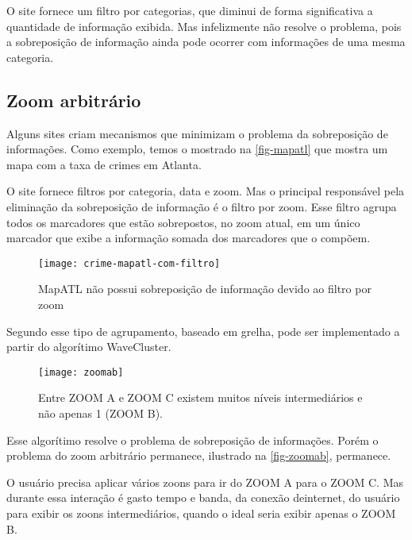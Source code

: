 O site fornece um filtro por categorias, que diminui de forma significativa a quantidade de informação exibida.  Mas infelizmente não resolve o problema, pois a sobreposição de informação ainda pode ocorrer com informações de uma mesma categoria.



\subsection{Zoom arbitrário}
Alguns sites criam mecanismos que minimizam o problema da sobreposição de informações. Como exemplo, temos o   mostrado na \autoref{fig-mapatl} que mostra um mapa com a taxa de crimes em Atlanta. 

O site fornece filtros por categoria, data e zoom. Mas o principal responsável pela eliminação da sobreposição de informação é o filtro por zoom. Esse filtro agrupa todos os marcadores que estão sobrepostos, no zoom atual, em um único marcador que exibe a informação somada dos marcadores que o compõem.
 
\begin{figure}[htb]
	\caption{\label{fig-mapatl} MapATL não possui sobreposição de informação devido ao filtro por zoom}
	\begin{center}
	    \texttt{[image: crime-mapatl-com-filtro]}
	\end{center}
\end{figure}

Segundo \cite[42,44]{silva2010solap+} esse tipo de agrupamento, baseado em grelha, pode ser implementado a partir do algorítimo WaveCluster\cite{wavecluster}. 

 

\begin{figure}[htb]
	\caption{\label{fig-zoomab} Entre ZOOM A e ZOOM C existem muitos níveis intermediários e não apenas 1 (ZOOM B).}
	\begin{center}
	    \texttt{[image: zoomab]}
	\end{center}
\end{figure}

Esse algorítimo resolve o problema de sobreposição de informações. Porém o problema do zoom arbitrário permanece, ilustrado na \autoref{fig-zoomab}, permanece.

O usuário precisa aplicar vários zoons para ir do ZOOM A para o ZOOM C. Mas durante essa interação é gasto tempo e banda, da conexão deinternet, do usuário para exibir os zoons intermediários, quando o ideal seria exibir apenas o ZOOM B.

